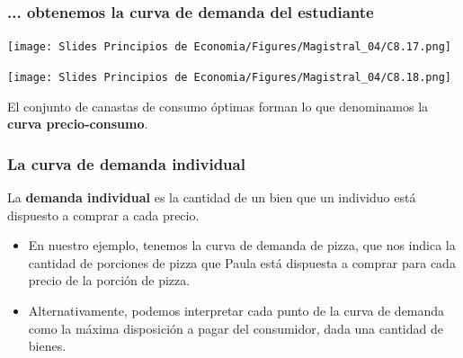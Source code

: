 \documentclass{beamer}
\begin{document}
\begin{frame}
\frametitle{... obtenemos la curva de demanda del estudiante}
\begin{center}
  \begin{minipage}{0.48\textwidth}
      \texttt{[image: Slides Principios de Economia/Figures/Magistral\_04/C8.17.png]}
  \end{minipage}\hfill
  \begin{minipage}{0.48\textwidth}
      \texttt{[image: Slides Principios de Economia/Figures/Magistral\_04/C8.18.png]}
  \end{minipage}
\end{center}
\vspace{3mm}
El conjunto de canastas de consumo óptimas forman lo que denominamos la \textbf{curva precio-consumo}.
\end{frame}

\begin{frame}
\frametitle{La curva de demanda individual}
    \begin{boxB}
    \begin{center}
    La \textbf{demanda individual} es la cantidad de un bien que un individuo está dispuesto a comprar a cada precio.
    \end{center}
    \end{boxB}
    \begin{itemize}
    \item En nuestro ejemplo, tenemos la curva de demanda de pizza, que nos indica la cantidad de porciones de pizza que Paula está dispuesta a comprar para cada precio de la porción de pizza. \vspace{3mm}
    \item Alternativamente, podemos interpretar cada punto de la curva de demanda como la máxima disposición a pagar del consumidor, dada una cantidad de bienes.
    \end{itemize}
\end{frame}
\end{document}
